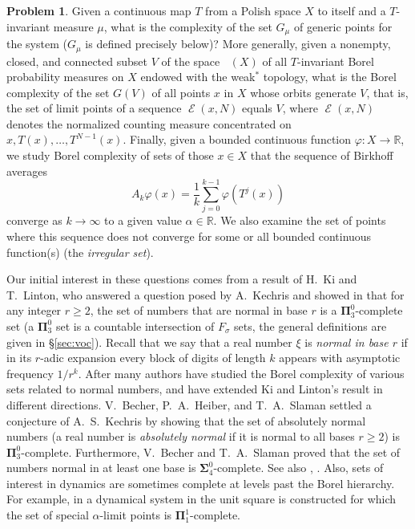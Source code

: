 \documentclass{amsart}
\theoremstyle{definition}
\newtheorem*{prob*}{Problem}
\newcommand{\base}{r}
\newcommand{\bs}{\boldsymbol{\Sigma}}
\newcommand{\bp}{\boldsymbol{\Pi}}
\newcommand{\bP}{\boldsymbol{\Pi}}
\DeclareMathOperator{\Emp}{\mathcal{E}}%
\renewcommand{\phi}{\varphi}
\DeclareMathOperator{\MT}{\mathcal{M}_{\mathit T} }
\newcommand{\R}{\mathbb{R}}
\begin{document}
\begin{prob*}
Given a continuous map $T$ from a Polish space $X$ to itself and a $T$-invariant
measure $\mu$, what is the complexity of the set $G_\mu$ of
generic points for the system ($G_\mu$ is defined precisely below)?
More generally, given a
nonempty, closed, and connected subset $V$ of the space $\MT(X)$ of
all $T$-invariant Borel probability measures on $X$ endowed with the
weak$^*$ topology, what is the Borel complexity of the set $G(V)$ of all
points $x$ in $X$ whose orbits generate $V$, that is, the set of limit
points of a sequence $\Emp(x,N)$ equals $V$, where $\Emp(x,N)$ denotes
the normalized counting measure concentrated on
$x,T(x),\ldots,T^{N-1}(x)$. Finally, given a bounded continuous function $\phi\colon X\to\R$, we study Borel complexity of sets of those $x\in X$ that
the sequence of Birkhoff averages
\[
A_k\phi(x)=\frac1k\sum_{j=0}^{k-1}\phi(T^j(x))
\]
converge as $k\to\infty$ to a given value $\alpha\in\R$. We also examine the set of points where this sequence does not converge for some or all bounded continuous function(s) (the \emph{irregular set}).
\end{prob*}

Our initial interest in these questions comes from a result of H.\ Ki and T.\ Linton, who answered a question posed by A.~Kechris
and showed in \cite{KiLinton} that for any
integer $\base \geq 2$, the set of numbers that are normal in base $\base$ is
a $\bp^0_3$-complete set (a $\bp^0_3$ set is a countable intersection of $F_\sigma$ sets,
the general definitions are given in  \S\ref{sec:voc}). Recall that we say that a real
number $\xi$ is {\em normal in base $\base$} if in its $\base$-adic expansion
every block of digits of length $k$ appears with asymptotic frequency
$1/\base^k$. After \cite{KiLinton} many authors have studied
the Borel complexity of various sets related to normal numbers, and
have extended Ki and Linton's result in different directions.
V.\ Becher, P.\ A.\ Heiber, and T.\ A.\ Slaman \cite{BecherHeiberSlamanAbsNormal}
settled a conjecture of A.\ S.\ Kechris by showing that the set of
absolutely normal numbers (a real number is {\em absolutely normal}
if it is normal to all bases $\base\ge 2$)
is $\bp^0_3$-complete. Furthermore, V.\ Becher and T.\ A.\ Slaman \cite{BecherSlamanNormal}
proved that the set of numbers normal in at least one base is
$\bs^0_4$-complete. See also \cite{AireyJacksonManceComplexityNormalPreserves}, \cite{BerosDifferenceSet}.
Also, sets of interest in dynamics are sometimes complete at levels past the Borel hierarchy.
For example, in \cite{JMR} a dynamical system in the unit square is constructed for which the set of
special $\alpha$-limit points is $\bP^1_1$-complete.
\end{document}
